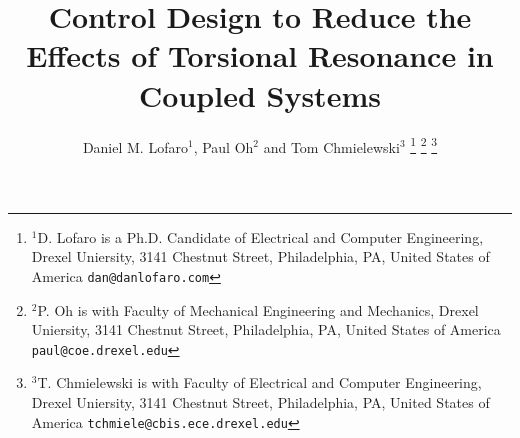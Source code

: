 \documentclass[letterpaper, 10 pt, conference]{ieeeconf}  %
\title{\LARGE \bf
Control Design to Reduce the Effects of Torsional Resonance in Coupled Systems
}
\author{Daniel M. Lofaro$^{1}$, Paul Oh$^{2}$ and Tom Chmielewski$^{3}$%
\thanks{$^{1}$D. Lofaro is a Ph.D. Candidate of Electrical and Computer Engineering,
        Drexel Uniersity, 3141 Chestnut Street, Philadelphia, PA, United States of America
        {\tt\small dan@danlofaro.com}}%
\thanks{$^{2}$P. Oh is with Faculty of Mechanical Engineering and Mechanics, Drexel Uniersity, 3141 Chestnut Street, Philadelphia, PA, United States of America
        {\tt\small paul@coe.drexel.edu}}%
\thanks{$^{3}$T. Chmielewski is with Faculty of Electrical and Computer Engineering,
        Drexel Uniersity, 3141 Chestnut Street, Philadelphia, PA, United States of America
        {\tt\small tchmiele@cbis.ece.drexel.edu}}%
}
\begin{document}
\maketitle
\thispagestyle{empty}
\pagestyle{empty}


\begin{abstract}

\end{abstract}

\IEEEpeerreviewmaketitle



%
%
%

%



%
{}
  




\end{document}
